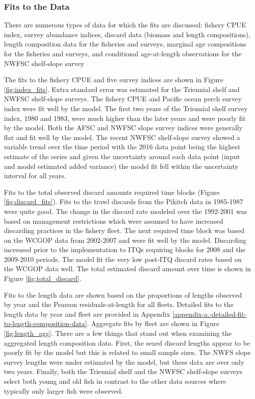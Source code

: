 \documentclass[12pt,]{article}
\begin{document}
\subsubsection{Fits to the Data}\label{fits-to-the-data}

There are numerous types of data for which the fits are discussed:
fishery CPUE index, survey abundance indices, discard data (biomass and
length compositions), length composition data for the fisheries and
surveys, marginal age compositions for the fisheries and surveys, and
conditional age-at-length observations for the NWFSC shelf-slope survey

The fits to the fishery CPUE and five survey indices are shown in Figure
\ref{fig:index_fits}. Extra standard error was estimated for the
Triennial shelf and NWFSC shelf-slope surveys. The fishery CPUE and
Pacific ocean perch survey index were fit well by the model. The first
two years of the Triennial shelf survey index, 1980 and 1983, were much
higher than the later years and were poorly fit by the model. Both the
AFSC and NWFSC slope survey indices were generally flat and fit well by
the model. The recent NWFSC shelf-slope survey showed a variable trend
over the time period with the 2016 data point being the highest estimate
of the series and given the uncertainty around each data point (input
and model estimated added variance) the model fit fell within the
uncertainty interval for all years.

Fits to the total observed discard amounts required time blocks (Figure
\ref{fig:discard_fits}). Fits to the trawl discards from the Pikitch
data in 1985-1987 were quite good. The change in the discard rate
modeled over the 1992-2001 was based on management restrictions which
were assumed to have increased discarding practices in the fishery
fleet. The next required time block was based on the WCGOP data from
2002-2007 and were fit well by the model. Discarding increased prior to
the implementation to ITQs requiring blocks for 2008 and the 2009-2010
periods. The model fit the very low post-ITQ discard rates based on the
WCGOP data well. The total estimated discard amount over time is shown
in Figure \ref{fig:total_discard}.

Fits to the length data are shown based on the proportions of lengths
observed by year and the Pearson residuals-at-length for all fleets.
Detailed fits to the length data by year and fleet are provided in
Appendix \ref{appendix-a.-detailed-fit-to-length-composition-data}.
Aggregate fits by fleet are shown in Figure \ref{fig:length_agg}. There
are a few things that stand out when examining the aggregated length
composition data. First, the sexed discard lengths appear to be poorly
fit by the model but this is related to small sample sizes. The NWFS
slope survey lengths were under estimated by the model, but these data
are over only two years. Finally, both the Triennial shelf and the NWFSC
shelf-slope surveys select both young and old fish in contrast to the
other data sources where typically only larger fish were observed.
\end{document}
